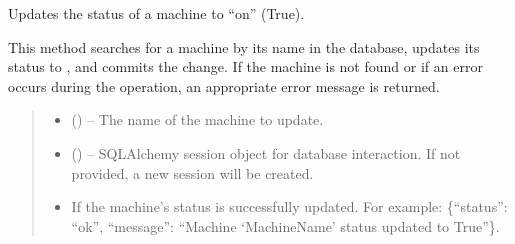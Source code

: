 \documentclass[letterpaper,10pt,english]{sphinxmanual}
\begin{document}
\begin{fulllineitems}
\begin{fulllineitems}
\begin{quote}
\begin{description}
\end{description}\end{quote}

\end{fulllineitems}


\begin{fulllineitems}
\label{\detokenize{app.controllers:app.controllers.machine_controller.MachineController.updateMachineStatusOn}}
\pysigstartsignatures
\pysiglinewithargsret
{}
{\sphinxparamcomma {}}
{}
\pysigstopsignatures
\sphinxAtStartPar
Updates the status of a machine to “on” (True).

\sphinxAtStartPar
This method searches for a machine by its name in the database, updates its 
status to , and commits the change. If the machine is not found or if an error
occurs during the operation, an appropriate error message is returned.
\begin{quote}\begin{description}
\begin{itemize}
\item {} 
\sphinxAtStartPar
{} () – The name of the machine to update.

\item {} 
\sphinxAtStartPar
{} (\sphinxstyleliteralemphasis{\sphinxupquote{, }}) – SQLAlchemy session object for database interaction.
If not provided, a new session will be created.

\end{itemize}

\sphinxAtStartPar
\begin{description}
\begin{itemize}
\item {} \begin{description}
\sphinxAtStartPar
If the machine’s status is successfully updated. For example:
\{“status”: “ok”, “message”: “Machine ‘MachineName’ status updated to True”\}.


\end{description}
\end{itemize}
\end{description}
\end{description}
\end{quote}
\end{fulllineitems}
\end{fulllineitems}
\end{document}
